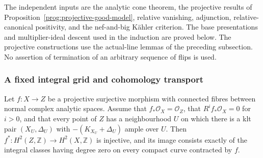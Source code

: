 The independent inputs are the analytic cone theorem, the projective
results of Proposition~\ref{prog:projective-good-model}, relative
vanishing, adjunction, relative-canonical positivity, and the
nef-and-big K\"ahler criterion. The base presentations and
multiplier-ideal descent used in the induction are proved below.
The projective constructions use the actual-line lemmas of the preceding
subsection. No assertion of termination of an arbitrary sequence of
flips is used.



\subsubsection{A fixed integral grid and cohomology transport}

\begin{lemma}
\label{prog:integral-h2}
Let $f:X\to Z$ be a projective surjective morphism with connected fibres
between normal complex analytic spaces. Assume that $f_*\mathcal O_X=
\mathcal O_Z$, that $R^if_*\mathcal O_X=0$ for $i>0$, and that every point
of $Z$ has a neighbourhood $U$ on which there is a klt pair
$(X_U,\Delta_U)$ with $-(K_{X_U}+\Delta_U)$ ample over $U$.
Then $f^*:H^2(Z,\mathbb Z)\to H^2(X,\mathbb Z)$ is injective, and its
image consists exactly of the integral classes having degree zero on
every compact curve contracted by $f$.
\end{lemma}

